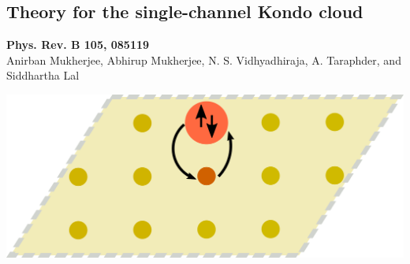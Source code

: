 \documentclass[8pt,aspectratio=169]{beamer}
\begin{document}
\begin{frame}{}
\section{Theory for the single-channel Kondo cloud}
\begin{minipage}{0.55\textwidth}
	\small{{\bf Phys. Rev. B 105, 085119}\\[10pt]
Anirban Mukherjee, \alert{Abhirup Mukherjee}, N. S. Vidhyadhiraja, A. Taraphder, and Siddhartha Lal}
\end{minipage}
\hspace*{\fill}
\begin{minipage}{0.4\textwidth}
	\includegraphics[width=\textwidth]{kondo-effect.pdf}
\end{minipage}
\end{frame}
\end{document}
